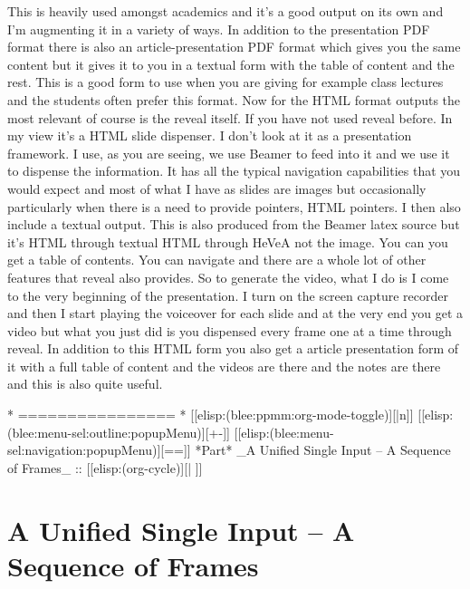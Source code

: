 \begin{whenOrg}
\begin{frame}[fragile,plain,label=outputFormsWalkthrough]
{This is heavily used amongst academics and it's a good output on its own and I'm augmenting
it in a variety of ways. In addition to the presentation PDF format there is also an
article-presentation PDF format which gives you the same content but it gives it to you in
a textual form with the table of content and the rest. This is a good form to use when you are giving
for example class lectures and the students often prefer this format.
Now for the HTML format outputs the most relevant of course is the reveal itself. If you have not used reveal
before. In my view it's a HTML slide dispenser. I don't look at it as a presentation framework.
I use, as you are seeing, we use Beamer to feed into it and we use it to dispense the information.
It has all the typical navigation capabilities that you would expect and most of
what I have as slides are images but occasionally particularly when there is a need to provide
pointers, HTML pointers. I then also include a textual output. This is also produced from the Beamer
latex source but it's HTML through textual HTML through HeVeA not the image.
You can you get a table of contents. You can navigate and there are a whole lot of other features
that reveal also provides. So to generate the video, what I do is I come to the very beginning of
the presentation. I turn on the screen capture recorder and then I start playing the voiceover for each
slide and at the very end you get a video but what you just did is you dispensed every frame
one at a time through reveal. In addition to this HTML form you also get a article presentation form of it
with a full table of content and the videos are there and the notes are there and this is also quite useful.


}

\end{frame}


\begin{whenOrg}
*      ================
*  [[elisp:(blee:ppmm:org-mode-toggle)][|n]] [[elisp:(blee:menu-sel:outline:popupMenu)][+-]] [[elisp:(blee:menu-sel:navigation:popupMenu)][==]]  *Part*   _A Unified Single Input -- A Sequence of Frames_ ::  [[elisp:(org-cycle)][| ]]
\end{whenOrg}

\newpage
\part{A Unified Single Input -- A Sequence of Frames}



\end{whenOrg}
